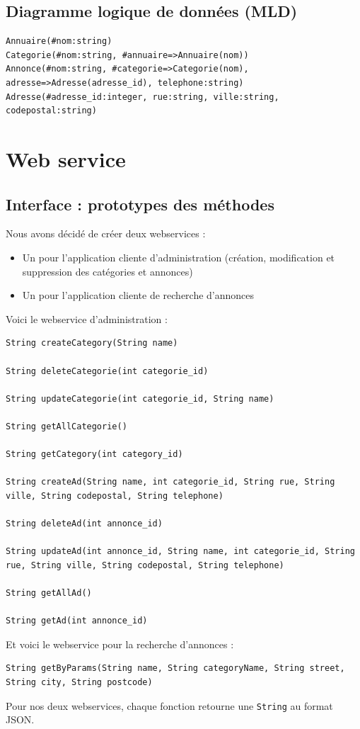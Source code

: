 \section{Diagramme logique de données (MLD)}

\fakeshell
\begin{lstlisting}
Annuaire(#nom:string)
Categorie(#nom:string, #annuaire=>Annuaire(nom))
Annonce(#nom:string, #categorie=>Categorie(nom), adresse=>Adresse(adresse_id), telephone:string)
Adresse(#adresse_id:integer, rue:string, ville:string, codepostal:string)
\end{lstlisting}

\chapter{Web service}

\section{Interface : prototypes des méthodes}

Nous avons décidé de créer deux webservices :

\begin{itemize}
    \item Un pour l'application cliente d'administration (création, modification et suppression des catégories et annonces)
    \item Un pour l'application cliente de recherche d'annonces
\end{itemize}

Voici le webservice d'administration :

\java
\begin{lstlisting}
String createCategory(String name)

String deleteCategorie(int categorie_id)

String updateCategorie(int categorie_id, String name)

String getAllCategorie()

String getCategory(int category_id)

String createAd(String name, int categorie_id, String rue, String ville, String codepostal, String telephone)

String deleteAd(int annonce_id)

String updateAd(int annonce_id, String name, int categorie_id, String rue, String ville, String codepostal, String telephone)

String getAllAd()

String getAd(int annonce_id)
\end{lstlisting}
Et voici le webservice pour la recherche d'annonces :
\begin{lstlisting}
String getByParams(String name, String categoryName, String street, String city, String postcode)
\end{lstlisting}
Pour nos deux webservices, chaque fonction retourne une \lstinline{String} au format JSON.

